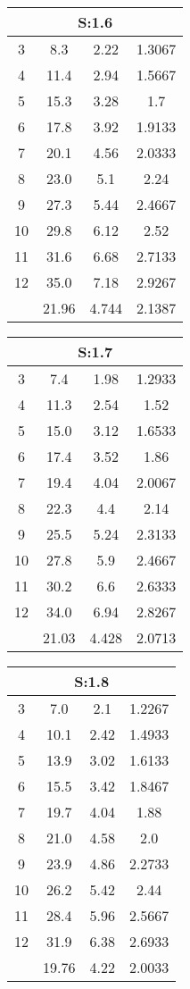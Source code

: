 \begin{table}[H]
\begin{tabular}{c|ccc}
\multicolumn{4}{c}{S:1.6}\\\hline
3 & 8.3 & 2.22 & 1.3067\\
4 & 11.4 & 2.94 & 1.5667\\
5 & 15.3 & 3.28 & 1.7\\
6 & 17.8 & 3.92 & 1.9133\\
7 & 20.1 & 4.56 & 2.0333\\
8 & 23.0 & 5.1 & 2.24\\
9 & 27.3 & 5.44 & 2.4667\\
10 & 29.8 & 6.12 & 2.52\\
11 & 31.6 & 6.68 & 2.7133\\
12 & 35.0 & 7.18 & 2.9267\\
\hline
& 21.96 & 4.744 & 2.1387\\
\end{tabular}
\end{table}
\begin{table}[H]
\begin{tabular}{c|ccc}
\multicolumn{4}{c}{S:1.7}\\\hline
3 & 7.4 & 1.98 & 1.2933\\
4 & 11.3 & 2.54 & 1.52\\
5 & 15.0 & 3.12 & 1.6533\\
6 & 17.4 & 3.52 & 1.86\\
7 & 19.4 & 4.04 & 2.0067\\
8 & 22.3 & 4.4 & 2.14\\
9 & 25.5 & 5.24 & 2.3133\\
10 & 27.8 & 5.9 & 2.4667\\
11 & 30.2 & 6.6 & 2.6333\\
12 & 34.0 & 6.94 & 2.8267\\
\hline
& 21.03 & 4.428 & 2.0713\\
\end{tabular}
\end{table}
\begin{table}[H]
\begin{tabular}{c|ccc}
\multicolumn{4}{c}{S:1.8}\\\hline
3 & 7.0 & 2.1 & 1.2267\\
4 & 10.1 & 2.42 & 1.4933\\
5 & 13.9 & 3.02 & 1.6133\\
6 & 15.5 & 3.42 & 1.8467\\
7 & 19.7 & 4.04 & 1.88\\
8 & 21.0 & 4.58 & 2.0\\
9 & 23.9 & 4.86 & 2.2733\\
10 & 26.2 & 5.42 & 2.44\\
11 & 28.4 & 5.96 & 2.5667\\
12 & 31.9 & 6.38 & 2.6933\\
\hline
& 19.76 & 4.22 & 2.0033\\
\end{tabular}
\end{table}
